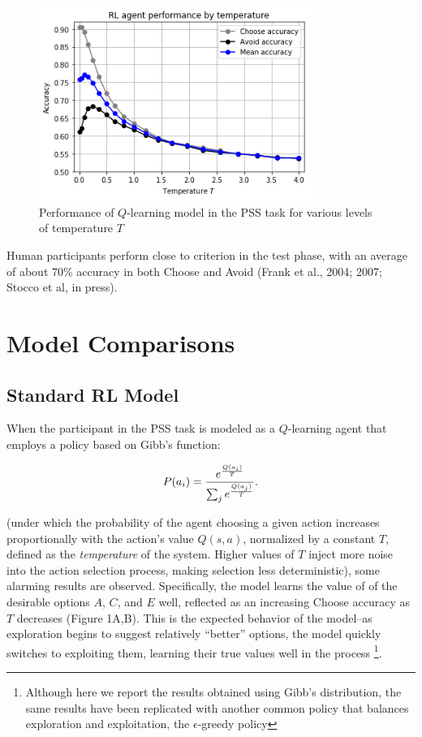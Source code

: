 \documentclass[10pt,letterpaper]{article}
\begin{document}
\begin{figure}[ht]
	\begin{center}
		\includegraphics[width=3.5in]{rl-performance.png}
	\end{center}
	\caption{Performance of $Q$-learning model in the PSS task for various levels of temperature $T$} 
	\label{pss}
\end{figure}

Human participants perform close to criterion in the test phase, with an average of about 70\% accuracy in both Choose and Avoid (Frank et al., 2004; 2007; Stocco et al, in press).

\section{Model Comparisons}

\subsection{Standard RL Model}

When the participant in the PSS task is modeled as a $Q$-learning agent that employs a policy based on Gibb’s function:

\begin{equation}
P(a_i) = \frac{e^{\frac{Q(a_i)}{T}}}{\sum_{j} e^{\frac{Q(a_j)}{T}}}\\.
\end{equation}

(under which the probability of the agent choosing a given action increases proportionally with the action's value $Q(s,a)$, normalized by a constant $T$, defined as the \emph{temperature} of the system. Higher values of $T$ inject more noise into the action selection process, making selection less deterministic), some alarming results are observed. Specifically, the model learns the value of of the desirable options $A$, $C$, and $E$ well, reflected as an increasing Choose accuracy as $T$ decreases (Figure 1A,B). This is the expected behavior of the model--as exploration begins to suggest relatively ``better'' options, the model quickly switches to exploiting them, learning their true values well in the process \footnote{Although here we report the results obtained using Gibb's distribution, the same results have been replicated with another common policy that balances exploration and exploitation, the $\epsilon$-greedy policy}. 
\end{document}
